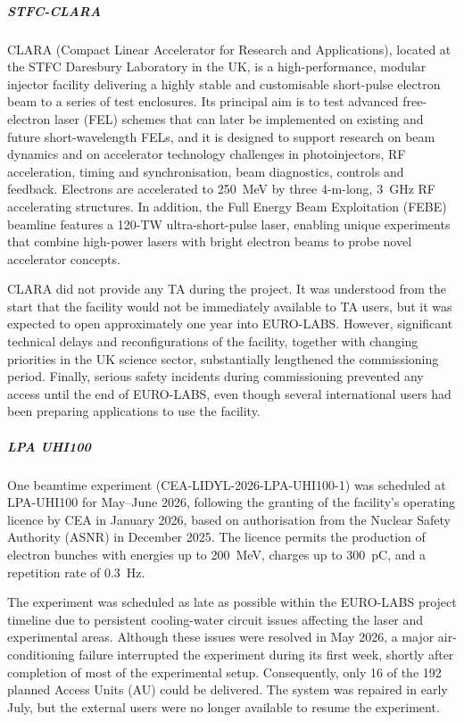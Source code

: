 
\subparagraph{STFC-CLARA} \mbox{}

CLARA (Compact Linear Accelerator for Research and Applications), located at the STFC Daresbury Laboratory in the UK, is a high-performance, modular injector facility delivering a highly stable and customisable short-pulse electron beam to a series of test enclosures. Its principal aim is to test advanced free-electron laser (FEL) schemes that can later be implemented on existing and future short-wavelength FELs, and it is designed to support research on beam dynamics and on accelerator technology challenges in photoinjectors, RF acceleration, timing and synchronisation, beam diagnostics, controls and feedback. Electrons are accelerated to \SI{250}{\MeV} by three 4-m-long, \SI{3}{\GHz} RF accelerating structures. In addition, the Full Energy Beam Exploitation (FEBE) beamline features a 120-TW ultra-short-pulse laser, enabling unique experiments that combine high-power lasers with bright electron beams to probe novel accelerator concepts.

CLARA did not provide any TA during the project. It was understood from the start that the facility would not be immediately available to TA users, but it was expected to open approximately one year into EURO-LABS. However, significant technical delays and reconfigurations of the facility, together with changing priorities in the UK science sector, substantially lengthened the commissioning period. Finally, serious safety incidents during commissioning prevented any access until the end of EURO-LABS, even though several international users had been preparing applications to use the facility.


\subparagraph{LPA UHI100} \mbox{}

One beamtime experiment (CEA-LIDYL-2026-LPA-UHI100-1) was scheduled at LPA-UHI100 for May–June 2026, following the granting of the facility's operating licence by CEA in January 2026, based on authorisation from the Nuclear Safety Authority (ASNR) in December 2025. The licence permits the production of electron bunches with energies up to \SI{200}{MeV}, charges up to \SI{300}{pC}, and a repetition rate of \SI{0.3}{Hz}.

The experiment was scheduled as late as possible within the EURO-LABS project timeline due to persistent cooling-water circuit issues affecting the laser and experimental areas. Although these issues were resolved in May 2026, a major air-conditioning failure interrupted the experiment during its first week, shortly after completion of most of the experimental setup. Consequently, only 16 of the 192 planned Access Units (AU) could be delivered. The system was repaired in early July, but the external users were no longer available to resume the experiment.

